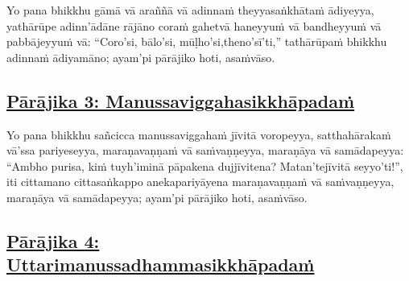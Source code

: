 Yo pana bhikkhu gāmā vā araññā vā adinnaṁ theyyasaṅkhātaṁ ādiyeyya, yathārūpe adinn'ādāne rājāno coraṁ gahetvā haneyyuṁ vā bandheyyuṁ vā pabbājeyyuṁ vā: ``Coro'si, bālo'si, mūḷho'si,\makeatletter\hyperlink{endnote31-appendix}\makeatother \thinspace theno'sī'ti,'' tathārūpaṁ bhikkhu adinnaṁ ādiyamāno; ayam'pi pārājiko hoti, asaṁvāso.



\subsection*{\hyperref[disq3]{Pārājika 3: Manussaviggahasikkhāpadaṁ}}
\label{par3}

Yo pana bhikkhu sañcicca manussaviggahaṁ jīvitā voropeyya, satthahārakaṁ vā'ssa pariyeseyya, maraṇavaṇṇaṁ vā saṁvaṇṇeyya, maraṇāya vā samādapeyya: ``Ambho purisa, kiṁ tuyh'iminā pāpakena dujjīvitena? Matan'te\makeatletter\hyperlink{endnote-appendix}\makeatother \thinspace jīvitā seyyo'ti!'', iti cittamano cittasaṅkappo anekapariyāyena maraṇavaṇṇaṁ vā saṁvaṇṇeyya, maraṇāya vā samādapeyya; ayam'pi pārājiko hoti, asaṁvāso.



\subsection*{\hyperref[disq4]{Pārājika 4: Uttarimanussadhammasikkhāpadaṁ}}

\label{par4}

